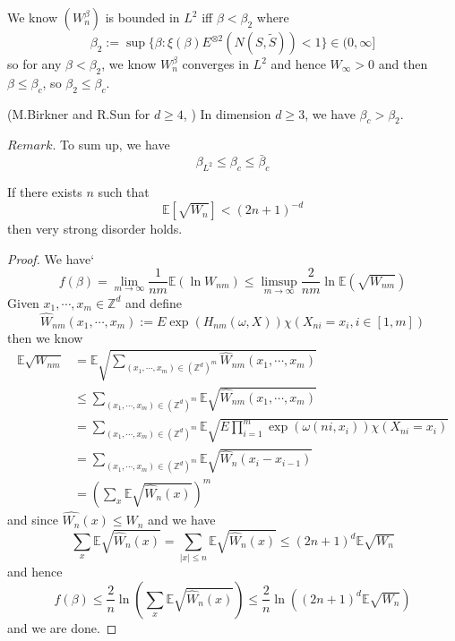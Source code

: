 \begin{definition}
    We know $(W_n^{\beta})$ is bounded in $L^2$ iff $\beta < \beta_2$ where
    \[
    \beta_2 := \sup\{\beta: \xi(\beta)E^{\otimes 2}(N(S,\tilde{S})) < 1\} \in (0,\infty]
    \]
    so for any $\beta < \beta_2$, we know $W_n^{\beta}$ converges in $L^2$ and hence $W_{\infty} > 0$ and then $\beta \leq \beta_c$, so $\beta_2 \leq \beta_c$.
\end{definition}

\begin{theorem}(M.Birkner and R.Sun for $d\geq 4$, )
    In dimension $d\geq 3$, we have $\beta_c > \beta_2$.
\end{theorem}
$Remark$. To sum up, we have
\[\beta_{L^2} \leq \beta_c \leq \bar{\beta}_c\]

\begin{proposition}
    If there exists $n$ such that
    \[
    \mathbb{E}[\sqrt{W_n}] < (2n+1)^{-d}
    \]
    then very strong disorder holds.
\end{proposition}
\begin{proof}
    We have`
    \[
    f(\beta) = \lim_{m\to\infty} \dfrac{1}{nm}\mathbb{E}(\ln W_{nm}) \leq \limsup_{m\to\infty} \dfrac{2}{nm} \ln \mathbb{E}(\sqrt{W_{nm}})
    \]
    Given $x_1,\cdots,x_m \in\mathbb{Z}^d$ and define
    \[
    \widehat{W}_{nm}(x_1,\cdots,x_m) := E\exp(H_{nm}(\omega, X))\chi(X_{ni} = x_i, i\in[1,m])
    \]
    then we know
    \[
    \begin{aligned}
           \mathbb{E}\sqrt{W_{nm}} &= \mathbb{E} \sqrt{\sum\limits_{(x_1,\cdots,x_m)\in (\mathbb{Z}^d)^m} \widehat{W}_{nm}(x_1,\cdots,x_m)} \\
           &\leq \sum\limits_{(x_1,\cdots,x_m)\in (\mathbb{Z}^d)^m} \mathbb{E}\sqrt{\widehat{W}_{nm}(x_1,\cdots,x_m)} \\
           &=  \sum\limits_{(x_1,\cdots,x_m)\in (\mathbb{Z}^d)^m}\mathbb{E}\sqrt{E\prod_{i=1}^m \exp(\omega(ni,x_i))\chi(X_{ni} = x_i)} \\
           &= \sum\limits_{(x_1,\cdots,x_m)\in (\mathbb{Z}^d)^m}\mathbb{E}\sqrt{\widehat{W}_n(x_i-x_{i-1})} \\
           &= \left(\sum_x \mathbb{E}\sqrt{\widehat{W}_n(x)}\right)^m
    \end{aligned}
    \]
    and since $\widehat{W_n}(x) \leq W_n$ and we have
    \[
    \sum_x \mathbb{E}\sqrt{\widehat{W}_n(x)} = \sum_{|x|\leq n}\mathbb{E}\sqrt{\widehat{W}_n(x)} \leq (2n+1)^d \mathbb{E}\sqrt{W_n}
    \]
    and hence
    \[
    f(\beta) \leq \dfrac{2}{n}\ln\left(\sum_x \mathbb{E}\sqrt{\widehat{W}_n(x)}\right) \leq \dfrac{2}{n}\ln\left((2n+1)^d\mathbb{E}\sqrt{W_n}\right)
    \]
    and we are done.
\end{proof}

